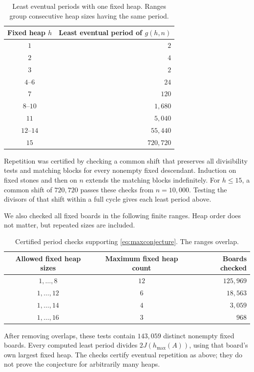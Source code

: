 \documentclass[10pt,a4paper]{article}
\begin{document}
\begin{table}[H]
\centering
\begin{tabular}{@{}c r@{}}
\toprule
Fixed heap $h$ & Least eventual period of $g(h,n)$\\
\midrule
$1$ & $2$\\
$2$ & $4$\\
$3$ & $2$\\
$4$--$6$ & $24$\\
$7$ & $120$\\
$8$--$10$ & $1{,}680$\\
$11$ & $5{,}040$\\
$12$--$14$ & $55{,}440$\\
$15$ & $720{,}720$\\
\bottomrule
\end{tabular}
\caption{Least eventual periods with one fixed heap. Ranges group
consecutive heap sizes having the same period.}
\label{tab:singleperiods}
\end{table}

Repetition was certified by checking a common shift that preserves
all divisibility tests and matching blocks for every nonempty fixed
descendant. Induction on fixed stones and then on $n$ extends the
matching blocks indefinitely. For $h\le15$, a common shift of
$720{,}720$ passes these checks from $n=10{,}000$. Testing the divisors
of that shift within a full cycle gives each least period above.

We also checked all fixed boards in the following finite ranges.
Heap order does not matter, but repeated sizes are included.

\begin{table}[H]
\centering
\begin{tabular}{@{}c c r@{}}
\toprule
Allowed fixed heap sizes & Maximum fixed heap count & Boards checked \\
\midrule
$1,\ldots,8$ & $12$ & $125{,}969$ \\
$1,\ldots,12$ & $6$ & $18{,}563$ \\
$1,\ldots,14$ & $4$ & $3{,}059$ \\
$1,\ldots,16$ & $3$ & $968$ \\
\bottomrule
\end{tabular}
\caption{Certified period checks supporting
\eqref{eq:maxconjecture}. The ranges overlap.}
\label{tab:periodcoverage}
\end{table}

After removing overlaps, these tests contain $143{,}059$ distinct
nonempty fixed boards. Every computed least period divides
$2J(h_{\max}(A))$, using that board's own largest fixed heap.
The checks certify eventual repetition as above; they do not
prove the conjecture for arbitrarily many heaps.
\end{document}

